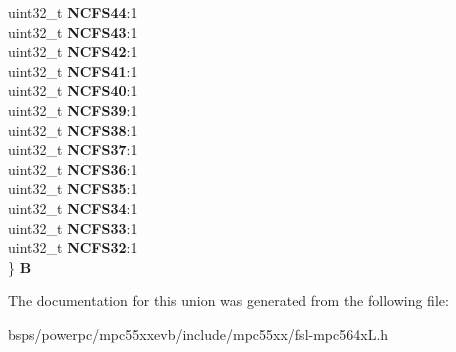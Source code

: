 \begin{DoxyCompactItemize}
\begin{tabbing}
\>uint32\_t {\bfseries NCFS44}:1\\
\>uint32\_t {\bfseries NCFS43}:1\\
\>uint32\_t {\bfseries NCFS42}:1\\
\>uint32\_t {\bfseries NCFS41}:1\\
\>uint32\_t {\bfseries NCFS40}:1\\
\>uint32\_t {\bfseries NCFS39}:1\\
\>uint32\_t {\bfseries NCFS38}:1\\
\>uint32\_t {\bfseries NCFS37}:1\\
\>uint32\_t {\bfseries NCFS36}:1\\
\>uint32\_t {\bfseries NCFS35}:1\\
\>uint32\_t {\bfseries NCFS34}:1\\
\>uint32\_t {\bfseries NCFS33}:1\\
\>uint32\_t {\bfseries NCFS32}:1\\
\} {\bfseries B}\\

\end{tabbing}\end{DoxyCompactItemize}


The documentation for this union was generated from the following file\+:\begin{DoxyCompactItemize}
\item 
bsps/powerpc/mpc55xxevb/include/mpc55xx/fsl-\/mpc564x\+L.\+h\end{DoxyCompactItemize}
